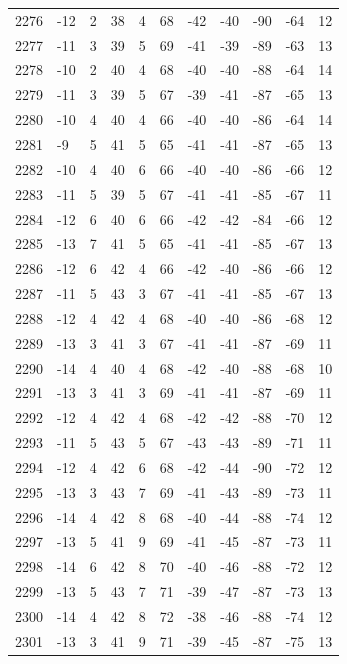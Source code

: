 \begin{table}[H]
\begin{tabular}{lllllllllll}
2276 & -12 & 2 & 38 & 4 & 68 & -42 & -40 & -90 & -64 & 12 \\
2277 & -11 & 3 & 39 & 5 & 69 & -41 & -39 & -89 & -63 & 13 \\
2278 & -10 & 2 & 40 & 4 & 68 & -40 & -40 & -88 & -64 & 14 \\
2279 & -11 & 3 & 39 & 5 & 67 & -39 & -41 & -87 & -65 & 13 \\
2280 & -10 & 4 & 40 & 4 & 66 & -40 & -40 & -86 & -64 & 14 \\
2281 & -9 & 5 & 41 & 5 & 65 & -41 & -41 & -87 & -65 & 13 \\
2282 & -10 & 4 & 40 & 6 & 66 & -40 & -40 & -86 & -66 & 12 \\
2283 & -11 & 5 & 39 & 5 & 67 & -41 & -41 & -85 & -67 & 11 \\
2284 & -12 & 6 & 40 & 6 & 66 & -42 & -42 & -84 & -66 & 12 \\
2285 & -13 & 7 & 41 & 5 & 65 & -41 & -41 & -85 & -67 & 13 \\
2286 & -12 & 6 & 42 & 4 & 66 & -42 & -40 & -86 & -66 & 12 \\
2287 & -11 & 5 & 43 & 3 & 67 & -41 & -41 & -85 & -67 & 13 \\
2288 & -12 & 4 & 42 & 4 & 68 & -40 & -40 & -86 & -68 & 12 \\
2289 & -13 & 3 & 41 & 3 & 67 & -41 & -41 & -87 & -69 & 11 \\
2290 & -14 & 4 & 40 & 4 & 68 & -42 & -40 & -88 & -68 & 10 \\
2291 & -13 & 3 & 41 & 3 & 69 & -41 & -41 & -87 & -69 & 11 \\
2292 & -12 & 4 & 42 & 4 & 68 & -42 & -42 & -88 & -70 & 12 \\
2293 & -11 & 5 & 43 & 5 & 67 & -43 & -43 & -89 & -71 & 11 \\
2294 & -12 & 4 & 42 & 6 & 68 & -42 & -44 & -90 & -72 & 12 \\
2295 & -13 & 3 & 43 & 7 & 69 & -41 & -43 & -89 & -73 & 11 \\
2296 & -14 & 4 & 42 & 8 & 68 & -40 & -44 & -88 & -74 & 12 \\
2297 & -13 & 5 & 41 & 9 & 69 & -41 & -45 & -87 & -73 & 11 \\
2298 & -14 & 6 & 42 & 8 & 70 & -40 & -46 & -88 & -72 & 12 \\
2299 & -13 & 5 & 43 & 7 & 71 & -39 & -47 & -87 & -73 & 13 \\
2300 & -14 & 4 & 42 & 8 & 72 & -38 & -46 & -88 & -74 & 12 \\
2301 & -13 & 3 & 41 & 9 & 71 & -39 & -45 & -87 & -75 & 13 \\

\end{tabular}
\end{table}
